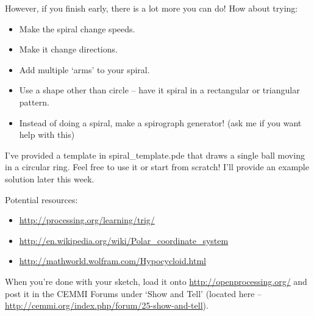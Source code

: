 However, if you finish early, there is a lot more you can do!  How about trying:

\begin{itemize}
\item Make the spiral change speeds.
\item Make it change directions.
\item Add multiple `arms' to your spiral.
\item Use a shape other than circle -- have it spiral in a rectangular or triangular pattern.
\item Instead of doing a spiral, make a spirograph generator! (ask me if you want help with this)
\end{itemize}

I've provided a template in spiral\_template.pde that draws a single ball moving in a circular ring.  Feel free to use it or start from scratch!  I'll provide an example solution later this week.

Potential resources:
\begin{itemize}
\item \url{http://processing.org/learning/trig/}
\item \url{http://en.wikipedia.org/wiki/Polar_coordinate_system}
\item \url{http://mathworld.wolfram.com/Hypocycloid.html}
\end{itemize}

When you're done with your sketch, load it onto \url{http://openprocessing.org/} and post it in the CEMMI Forums under `Show and Tell' (located here -- \url{http://cemmi.org/index.php/forum/25-show-and-tell}).
